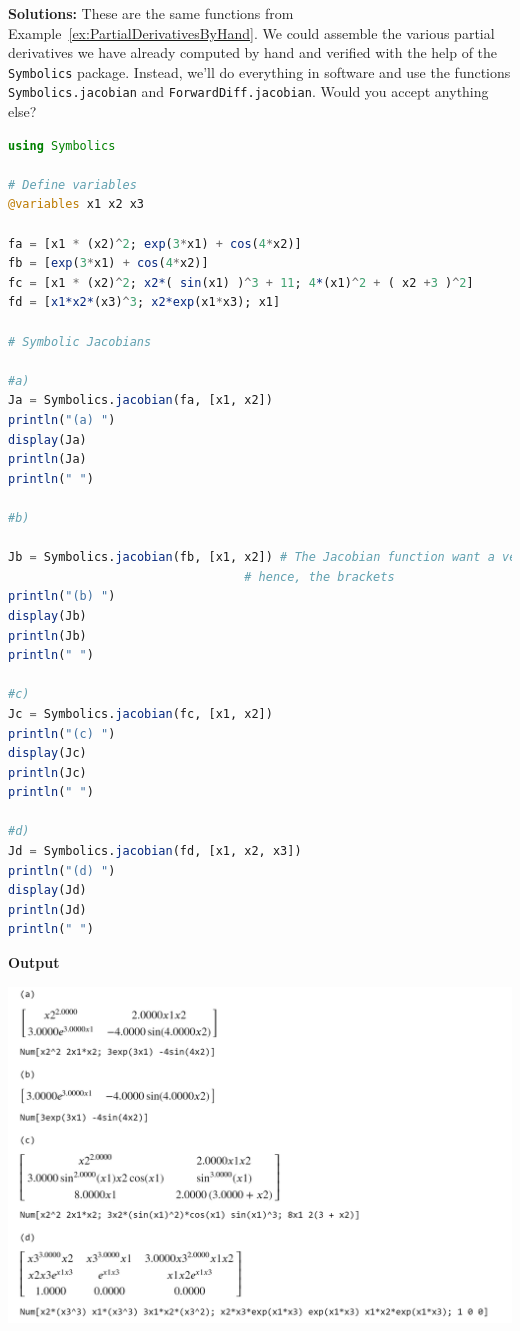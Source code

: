 \textbf{Solutions:} These are the same functions from Example~\ref{ex:PartialDerivativesByHand}. We could assemble the various partial derivatives we have already computed by hand and verified with the help of the \texttt{Symbolics} package. Instead, we'll do everything in software and use the functions \texttt{Symbolics.jacobian} and \texttt{ForwardDiff.jacobian}. Would you accept anything else?\\

\begin{lstlisting}[language=Julia,style=mystyle]
using Symbolics

# Define variables
@variables x1 x2 x3

fa = [x1 * (x2)^2; exp(3*x1) + cos(4*x2)]
fb = [exp(3*x1) + cos(4*x2)]  
fc = [x1 * (x2)^2; x2*( sin(x1) )^3 + 11; 4*(x1)^2 + ( x2 +3 )^2]
fd = [x1*x2*(x3)^3; x2*exp(x1*x3); x1]

# Symbolic Jacobians

#a)
Ja = Symbolics.jacobian(fa, [x1, x2])
println("(a) ")
display(Ja)
println(Ja)
println(" ")

#b)

Jb = Symbolics.jacobian(fb, [x1, x2]) # The Jacobian function want a vector
                                 # hence, the brackets
println("(b) ")
display(Jb)
println(Jb)
println(" ")

#c)
Jc = Symbolics.jacobian(fc, [x1, x2])
println("(c) ")
display(Jc)
println(Jc)
println(" ")

#d)
Jd = Symbolics.jacobian(fd, [x1, x2, x3])
println("(d) ")
display(Jd)
println(Jd)
println(" ")
\end{lstlisting}
\textbf{Output} 
\begin{center}
    \includegraphics[width=0.95\columnwidth]{graphics/Chap05/ScreenshotJacobianOutputV02.png}
\end{center}

